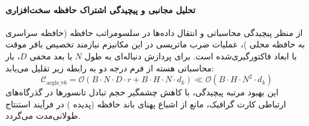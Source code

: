 \paragraph{تحلیل مجانبی و پیچیدگی اشتراک حافظه سخت‌افزاری}
از منظر پیچیدگی محاسباتی و انتقال داده‌ها در سلسومراتب حافظه (حافظه سراسری  به حافظه محلی )، عملیات ضرب ماتریسی در این مکانیزم نیازمند تخصیص بافر موقت با ابعاد فاکتورگیری‌شده است. برای پردازش دنباله‌ای به طول $N$ با بعد مخفی $D$، بار محاسباتی هسته از فرم درجه دو به رابطه زیر تقلیل می‌یابد:
\begin{equation}
\label{eq:complexity_aegis_v6}
\mathcal{C}_{\text{aegis\_v6}} = \mathcal{O}\left( B \cdot N \cdot D \cdot r + B \cdot H \cdot N \cdot d_k \right) \ll \mathcal{O}\left( B \cdot H \cdot N^2 \cdot d_k \right)
\end{equation}
این بهبود مرتبه پیچیدگی، با کاهش چشمگیر حجم تبادل تانسورها در گذرگاه‌های ارتباطی کارت گرافیک، مانع از اشباع پهنای باند حافظه (پدیده ) در فرآیند استنتاج طولانی‌مدت می‌گردد.
